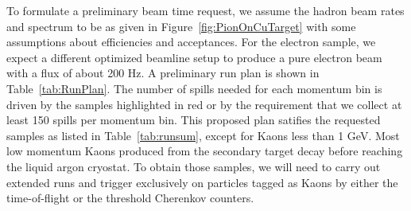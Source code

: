 To formulate a preliminary beam time request, we assume the hadron beam rates and spectrum to be as given in Figure~\ref{fig:PionOnCuTarget} with some assumptions about efficiencies and acceptances. For the electron sample, we expect a different optimized beamline setup to produce a pure electron beam with a flux of about 200 Hz. A preliminary run plan is shown in Table~\ref{tab:RunPlan}. The number of spills needed for each momentum bin is driven by the samples highlighted in red or by the requirement that we collect at least 150 spills per momentum bin. This proposed plan satifies the requested samples as listed in Table~\ref{tab:runsum}, except for Kaons less than 1 GeV. Most low momentum Kaons produced from the secondary target decay before reaching the liquid argon cryostat. To obtain those samples, we will need to carry out extended runs and trigger exclusively on particles tagged as Kaons by either the time-of-flight or the threshold Cherenkov counters.

